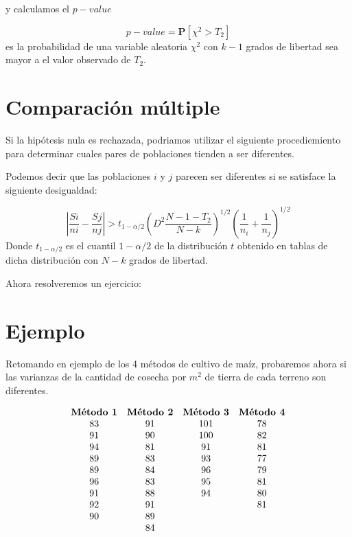 \documentclass[
  a4paper,
  oneside,
  openany]{book}
\begin{document}
y calculamos el \(p-value\)

\[p-value= \mathbf{P}\left[\chi^2>T_{2}\right]\]
es la probabilidad de una variable aleatoria \(\chi^2\) con \(k-1\) grados de libertad sea mayor a el valor observado de \(T_2\).

\hypertarget{comparaciuxf3n-muxfaltiple}{%
\section{Comparación múltiple}\label{comparaciuxf3n-muxfaltiple}}

Si la hipótesis nula es rechazada, podriamos utilizar el siguiente procediemiento para determinar cuales pares de poblaciones tienden a ser diferentes.

Podemos decir que las poblaciones \(i\) y \(j\) parecen ser diferentes si se satisface la siguiente desigualdad:

\[\left|\frac{Si}{ni}- \frac{Sj}{nj}\right|> t_{1-\alpha/2}\left(D^2\frac{N-1-T_{2}}{N-k}\right)^{1/2}\left(\frac{1}{n_i}+\frac{1}{n_j}\right)^{1/2}\]
Donde \(t_{1-\alpha/2}\) es el cuantil \(1-\alpha/2\) de la distribución \(t\) obtenido en tablas de dicha distribución con \(N-k\) grados de libertad.

Ahora resolveremos un ejercicio:

\hypertarget{ejemplo-9}{%
\section{Ejemplo}\label{ejemplo-9}}

Retomando en ejemplo de los 4 métodos de cultivo de maíz, probaremos ahora si las varianzas de la cantidad de cosecha por \(m^2\) de tierra de cada terreno son diferentes.

\[
\begin{array}{c c c c} 
\textbf{Método 1} & \textbf{Método 2} & \textbf{Método 3} & \textbf{Método 4}\\
83&91&101&78\\
91&90&100&82\\
94&81&91&81\\
89&83&93&77\\
89&84&96&79\\
96&83&95&81\\
91&88&94&80\\
92&91&  &81\\
90&89&  &\\
  &84&  &\\
\end{array}
\]
\end{document}
